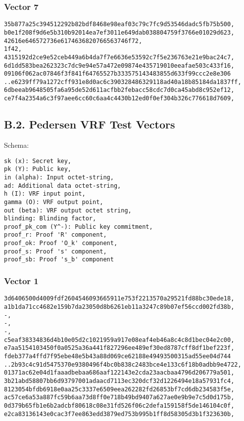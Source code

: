 \documentclass[
]{article}
\begin{document}
\subsubsection{Vector 7}\label{vector-7}

\begin{verbatim}
35b877a25c394512292b82bdf8468e98eaf03c79c7fc9d53546dadc5fb75b500,
b0e1f208f9d6e5b310b92014ea7ef3011e649dab038804759f3766e01029d623,
42616e646572736e6174636820766563746f72,
1f42,
4315192d2ce9e52ceb449a6b4da7f7e6636e53592c7f5e236763e21e9bac24c7,
6d1dd583bea262323c7dc9e94e57a472e09874e435719010eeafae503c433f16,
09106f062ac07846f3f841f64765527b333575143483855d633f99ccc2e8e306
..e6239ff79a1272cff931e8d0ac6c390328486329118ad40a18b85184da1837ff,
6dbeeab9648505fa6a95de52d611acfbb2febacc58cdc7d0ca45abd8c952ef12,
ce7f4a2354a6c3f97aee6cc60c6aa4c4430b12ed0f0ef304b326c776618d7609,
\end{verbatim}

\subsection{B.2. Pedersen VRF Test
Vectors}\label{b.2.-pedersen-vrf-test-vectors}

Schema:

\begin{verbatim}
sk (x): Secret key,
pk (Y): Public key,
in (alpha): Input octet-string,
ad: Additional data octet-string,
h (I): VRF input point,
gamma (O): VRF output point,
out (beta): VRF output octet string,
blinding: Blinding factor,
proof_pk_com (Y^-): Public key commitment,
proof_r: Proof 'R' component,
proof_ok: Proof 'O_k' component,
proof_s: Proof 's' component,
proof_sb: Proof 's_b' component
\end{verbatim}

\subsubsection{Vector 1}\label{vector-1-1}

\begin{verbatim}
3d6406500d4009fdf2604546093665911e753f2213570a29521fd88bc30ede18,
a1b1da71cc4682e159b7da23050d8b6261eb11a3247c89b07ef56ccd002fd38b,
-,
-,
-,
c5eaf38334836d4b10e05d2c1021959a917e08eaf4eb46a8c4c8d1bec04e2c00,
e7aa5154103450f0a0525a36a441f827296ee489ef30ed8787cff8df1bef223f,
fdeb377a4ffd7f95ebe48e5b43a88d069ce62188e49493500315ad55ee04d744
..2b93c4c91d5475370e9380496f4bc0b838c2483bce4e133c6f18b0adbb9e4722,
01371ac62e04d1faaadbebaa686aaf122143e2cda23aacbaa4796d206779a501,
3b21abd58807bb6d93797001adaacd7113ec320dcf32d1226494e18a57931fc4,
8123054bfdb6918e0aa25c3337e6509eea262282fd26853bf7cd6db234583f5e,
ac57ce6a53a887fc59b6aa73d8ff0e718b49bd9407a627ae0e9b9e7c5d0d175b,
0d379b65fb1e6b2adcbf80618c08e31fd526f06c2defa159158f5de146104c0f,
e2ca83136143e0cac3f7ee863edd3879ed753b995b1ff8d58305d3b1f323630b,
\end{verbatim}
\end{document}
